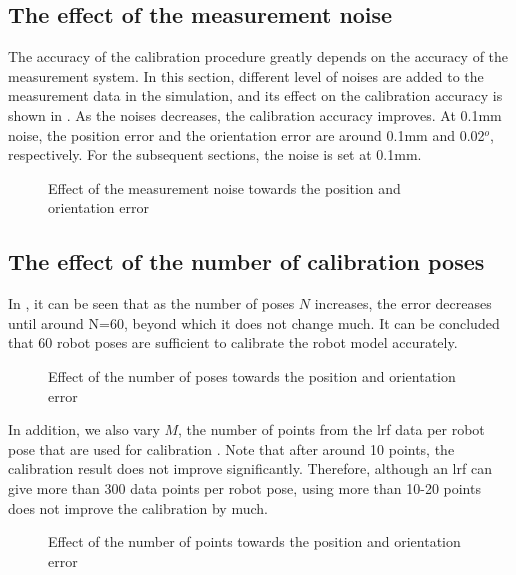 \subsection{The effect of the measurement noise}
\label{sec:meas_accuracy}
The accuracy of the calibration procedure greatly depends on the accuracy of the measurement system. In this section, different level of noises are added to the measurement data in the simulation, and its effect on the calibration accuracy is shown in . As the noises decreases, the calibration accuracy improves. At 0.1mm noise, the position error and the orientation error are around 0.1mm and 0.02$^o$, respectively. For the subsequent sections, the noise is set at 0.1mm. 
\begin{figure}[h]
  \centering
  \caption{Effect of the measurement noise towards the position and orientation error} 
  \label{fig:laser_accuracy}
\end{figure}


\subsection{The effect of the number of calibration poses}
\label{sec:calib_poses}
In , it can be seen that as the number of poses $N$ increases, the error decreases until around N=60, beyond which it does not change much. It can be concluded that 60 robot poses are sufficient to calibrate the robot model accurately. 

\begin{figure}[h]
  \centering
  \caption{Effect of the number of poses towards the position and orientation error} 
  \label{fig:num_of_poses}
\end{figure}

In addition, we also vary $M$, the number of points from the \ac{lrf} data per robot pose that are used for calibration . Note that after around 10 points, the calibration result does not improve significantly. Therefore, although an \ac{lrf} can give more than 300 data points per robot pose, using more than 10-20 points does not improve the calibration by much. 

\begin{figure}[h]
  \centering
  \caption{Effect of the number of points towards the position and orientation error} 
  \label{fig:num_of_points}
\end{figure}



